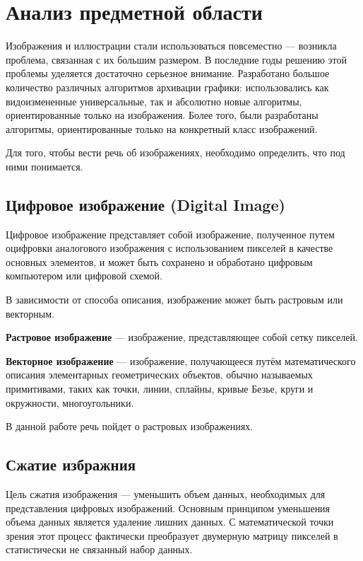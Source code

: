 \chapter{Анализ предметной области}

Изображения и иллюстрации стали использоваться повсеместно --- возникла проблема, связанная с их большим размером. В последние годы решению этой проблемы уделяется достаточно серьезное внимание. Разработано большое количество различных алгоритмов архивации графики: использовались как видоизмененные универсальные, так и абсолютно новые алгоритмы, ориентированные только на изображения. Более того, были разработаны алгоритмы, ориентированные только на конкретный класс изображений.

Для того, чтобы вести речь об изображениях, необходимо определить, что под ними понимается.

\section{Цифровое изображение (Digital Image)}

Цифровое изображение представляет собой изображение, полученное путем оцифровки аналогового изображения с использованием пикселей в качестве основных элементов, и может быть сохранено и обработано цифровым компьютером или цифровой схемой. \cite{DI}

В зависимости от способа описания, изображение может быть растровым или векторным.

\textbf{Растровое изображение} --- изображение, представляющее собой сетку пикселей.

\textbf{Векторное изображение} --- изображение, получающееся путём математического описания элементарных геометрических объектов, обычно называемых примитивами, таких как точки, линии, сплайны, кривые Безье, круги и окружности, многоугольники.  


В данной работе речь пойдет о растровых изображениях.

\section{Сжатие избражния}

Цель сжатия изображения --- уменьшить объем данных, необходимых для представления цифровых изображений. Основным принципом уменьшения объема данных является удаление лишних данных. С математической точки зрения этот процесс фактически преобразует двумерную матрицу пикселей в статистически не связанный набор данных. \cite{10}



